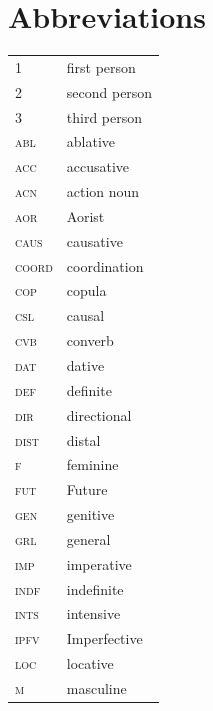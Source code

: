 \documentclass[output=paper,colorlinks,citecolor=brown]{langscibook}
\begin{document}
\section*{Abbreviations}
\begin{tabularx}{.45\textwidth}{lQ}
\textsc{1}      & first person \\ 
\textsc{2}      & second person \\ 
\textsc{3}      & third person \\ 
\textsc{abl}    & ablative \\ 
\textsc{acc}    &  accusative \\ 
\textsc{acn}   & action noun  \\ 
\textsc{aor}    &  Aorist \\ 
\textsc{caus}   &  causative \\ 
\textsc{coord}  &  coordination \\ 
\textsc{cop}    &  copula \\ 
\textsc{csl}    &  causal \\ 
\textsc{cvb}  &  converb  \\ 
\textsc{dat}    &  dative  \\ 
\textsc{def}    &  definite \\ 
\textsc{dir}    &  directional \\ 
\textsc{dist}   &  distal \\ 
\textsc{f}      &  feminine  \\ 
\textsc{fut}    &  Future \\ 
\textsc{gen}    &  genitive \\ 
\textsc{grl}  &  general   \\ 
\textsc{imp}    & imperative \\ 
\textsc{indf}   & indefinite \\ 
\textsc{ints}    & intensive  \\ 
\textsc{ipfv}   & Imperfective \\ 
\textsc{loc}    & locative \\ 
\textsc{m}      & masculine \\ 
\end{tabularx}
\end{document}
